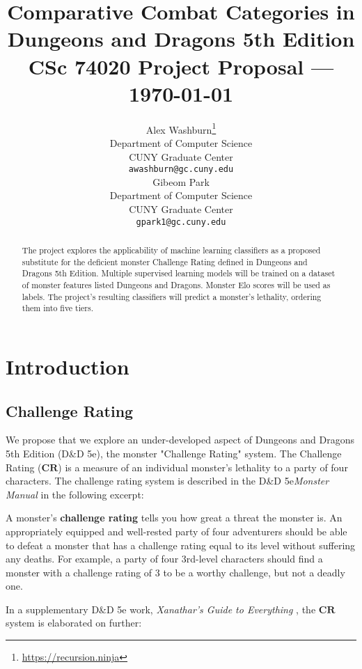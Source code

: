 \documentclass{article}
\title{Comparative Combat Categories in\\Dungeons and Dragons 5th Edition\\[5mm]\normalsize CSc 74020 Project Proposal --- \today}
\author{
  Alex Washburn\thanks{\url{https://recursion.ninja}} \\
  Department of Computer Science\\
  CUNY Graduate Center\\
  \texttt{awashburn@gc.cuny.edu} \\
  \And
  Gibeom Park\\
  Department of Computer Science\\
  CUNY Graduate Center\\
  \texttt{gpark1@gc.cuny.edu} \\
}
\newcommand{\CR}{\ensuremath{\mathbf{CR}}\xspace}
\newcommand{\DnD}{D\&D 5e\xspace}
\begin{document}


\maketitle

\begin{abstract}
The project explores the applicability of machine learning classifiers as a proposed substitute for the deficient monster Challenge Rating defined in Dungeons and Dragons 5th Edition.
Multiple supervised learning models will be trained on a dataset of monster features listed Dungeons and Dragons.
Monster Elo scores will be used as labels.
The project's resulting classifiers will predict a monster's lethality, ordering them into five tiers.
\end{abstract}


\section{Introduction}


\subsection{Challenge Rating}

We propose that we explore an under-developed aspect of Dungeons and Dragons 5th Edition (\DnD), the monster "Challenge Rating" system.
The Challenge Rating (\CR) is a measure of an individual monster’s lethality to a party of four characters.
The challenge rating system is described in the \DnD \emph{Monster Manual} \cite{DnD5eMonsterManual2014} in the following excerpt:

\begin{displayquote}
A monster's \textbf{challenge rating} tells you how great a threat the monster is.
An appropriately equipped and well-rested party of four adventurers should be able to
defeat a monster that has a challenge rating equal to its level without suffering any deaths.
For example, a party of four 3rd-level characters should find a monster with a challenge rating of 3 to be a worthy challenge, but not a deadly one.
\end{displayquote}

In a supplementary \DnD work, \emph{Xanathar's Guide to Everything} \cite{DnD5eXanathars2017}, the \CR system is elaborated on further:
\end{document}
